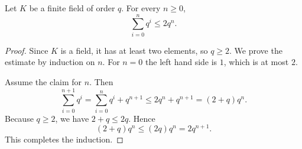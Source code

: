 \begin{helper}
Let \(K\) be a finite field of order \(q\).  For every \(n\ge0\),
\[
  \sum_{i=0}^{n}q^i\le 2q^n .
\]
\end{helper}
\begin{proof}
Since \(K\) is a field, it has at least two elements, so \(q\ge2\).  We prove
the estimate by induction on \(n\).  For \(n=0\) the left hand side is \(1\),
which is at most \(2\).

Assume the claim for \(n\).  Then
\[
  \sum_{i=0}^{n+1}q^i
  =\sum_{i=0}^{n}q^i+q^{n+1}
  \le 2q^n+q^{n+1}
  =(2+q)q^n.
\]
Because \(q\ge2\), we have \(2+q\le2q\).  Hence
\[
  (2+q)q^n\le (2q)q^n=2q^{n+1}.
\]
This completes the induction.
\end{proof}
